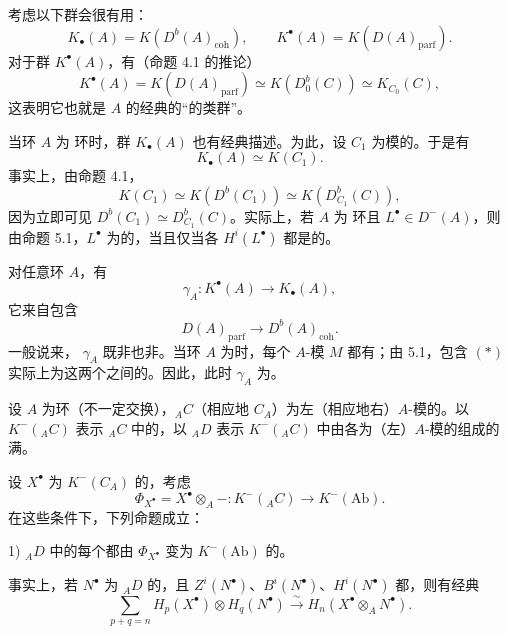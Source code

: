 考虑以下群会很有用：
\[
K_\bullet(A)=K(D^b(A)_{\mathrm{coh}}),\qquad
K^\bullet(A)=K(D(A)_{\mathrm{parf}}).
\]
对于群 $K^\bullet(A)$，有（命题 4.1 的推论）
\[
K^\bullet(A)=K(D(A)_{\mathrm{parf}})\simeq K(D_0^b(C))\simeq K_{C_0}(C),
\]
这表明它也就是 $A$ 的经典的“的类群”。

当环 $A$ 为  环时，群 $K_\bullet(A)$ 也有经典描述。为此，设 $C_1$ 为模的。于是有
\[
K_\bullet(A)\simeq K(C_1).
\]
事实上，由命题 4.1，
\[
K(C_1)\simeq K(D^b(C_1))\simeq K(D_{C_1}^b(C)),
\]
因为立即可见 $D^b(C_1)\simeq D_{C_1}^b(C)$。实际上，若 $A$ 为  环且 $L^\bullet\in D^-(A)$，则由命题 5.1，$L^\bullet$ 为的，当且仅当各 $H^i(L^\bullet)$ 都是的。

对任意环 $A$，有
\[
\gamma_A:K^\bullet(A)\longrightarrow K_\bullet(A),
\]
它来自包含
\[
D(A)_{\mathrm{parf}}\longrightarrow D^b(A)_{\mathrm{coh}}.\tag{$*$}
\]
一般说来， $\gamma_A$ 既非也非。当环 $A$ 为时，每个 $A$-模 $M$ 都有；由 5.1，包含 $(*)$ 实际上为这两个之间的。因此，此时 $\gamma_A$ 为。

设 $A$ 为环（不一定交换），${}_AC$（相应地 $C_A$）为左（相应地右）$A$-模的。以 $K^-({}_AC)$ 表示 ${}_AC$ 中的，以 ${}_AD$ 表示 $K^-({}_AC)$ 中由各为（左）$A$-模的组成的满。

设 $X^\bullet$ 为 $K^-(C_A)$ 的，考虑
\[
\Phi_{X^\bullet}=X^\bullet\otimes_A-:
K^-({}_AC)\longrightarrow K^-(\mathrm{Ab}).
\]
在这些条件下，下列命题成立：

1) ${}_AD$ 中的每个都由 $\Phi_{X^\bullet}$ 变为 $K^-(\mathrm{Ab})$ 的。

事实上，若 $N^\bullet$ 为 ${}_AD$ 的，且 $Z^i(N^\bullet)$、$B^i(N^\bullet)$、$H^i(N^\bullet)$ 都，则有经典
\[
\sum_{p+q=n}H_p(X^\bullet)\otimes H_q(N^\bullet)
\xrightarrow{\sim}H_n(X^\bullet\otimes_A N^\bullet).
\]

